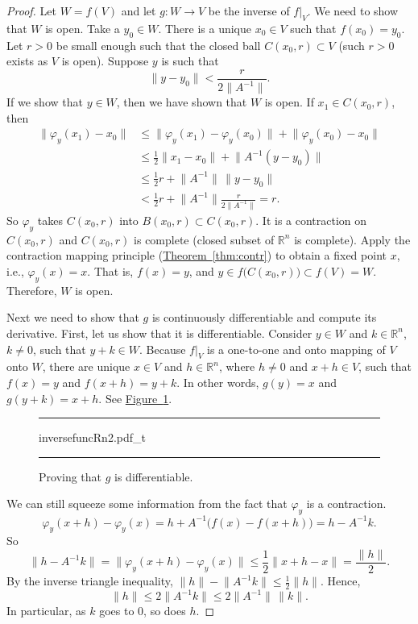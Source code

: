 \documentclass[12pt,openany]{book}
\newcommand{\snorm}[1]{\lVert {#1} \rVert}
\newcommand{\R}{{\mathbb{R}}}
\theoremstyle{plain}
\theoremstyle{remark}
\theoremstyle{definition}
\newenvironment{myfig}{%
\begin{figure}[h!t]
\noindent\rule{\textwidth}{0.5pt}\vspace{12pt}\par\centering}%
{\par\noindent\rule{\textwidth}{0.5pt}
\end{figure}}
\theoremstyle{exercise}
\theoremstyle{example}
\newcommand{\figureref}[1]{\hyperref[#1]{Figure~\ref*{#1}}}
\newcommand{\thmref}[1]{\hyperref[#1]{Theorem~\ref*{#1}}}
\begin{document}
\begin{proof}
Let $W = f(V)$ and let $g \colon W \to V$ be the inverse of $f|_V$.
We need to show that $W$ is open.  Take a $y_0 \in W$.
There is a unique $x_0 \in V$ such that $f(x_0) = y_0$.
Let $r > 0$ be small enough such that the closed ball $C(x_0,r) \subset V$
(such $r > 0$ exists as $V$ is open).
Suppose $y$ is such that
\begin{equation*}
\snorm{y-y_0} <
\frac{r}{2\snorm{A^{-1}}} .
\end{equation*}
If we show that $y \in W$, then we have shown that $W$ is open.
If $x_1 \in
C(x_0,r)$, then
\begin{equation*}
\begin{split}
\snorm{\varphi_y(x_1)-x_0}
& \leq
\snorm{\varphi_y(x_1)-\varphi_y(x_0)} +
\snorm{\varphi_y(x_0)-x_0} \\
& \leq
\frac{1}{2}\snorm{x_1-x_0} +
\snorm{A^{-1}(y-y_0)} \\
& \leq
\frac{1}{2}r +
\snorm{A^{-1}} \, \snorm{y-y_0} \\
& <
\frac{1}{2}r +
\snorm{A^{-1}}
\frac{r}{2\snorm{A^{-1}}} = r .
\end{split}
\end{equation*}
So $\varphi_y$ takes $C(x_0,r)$ into $B(x_0,r) \subset C(x_0,r)$.  It is a
contraction on $C(x_0,r)$ and $C(x_0,r)$ is complete (closed subset of $\R^n$
is complete).
Apply the contraction mapping principle (\thmref{thm:contr})
to obtain a fixed point $x$,
i.e., $\varphi_y(x) = x$.  That is, $f(x) = y$, and $y \in
f\bigl(C(x_0,r)\bigr) \subset f(V) = W$.  Therefore, $W$ is open.

Next we need to show that $g$ is continuously differentiable and compute
its derivative.  First, let us show that it is differentiable.
Consider $y \in W$ and $k \in \R^n$, $k\not= 0$, such that $y+k \in W$.
Because $f|_V$ is a one-to-one and onto mapping of $V$ onto $W$,
there are unique
$x \in V$ and $h \in \R^n$, where $h \not= 0$ and $x+h \in V$, such that
$f(x) = y$ and $f(x+h) = y+k$.
In other words, $g(y) = x$ and $g(y+k) = x+h$.  See
\figureref{fig:inversefuncRn2}.
\begin{myfig}
{inversefuncRn2.pdf_t}
\caption{Proving that $g$ is differentiable.\label{fig:inversefuncRn2}}
\end{myfig}

We can still
squeeze some information from the fact that $\varphi_y$ is a contraction.
\begin{equation*}
\varphi_y(x+h)-\varphi_y(x) = h + A^{-1} \bigl( f(x)-f(x+h) \bigr) = h - A^{-1} k .
\end{equation*}
So
\begin{equation*}
\snorm{h-A^{-1}k} = \snorm{\varphi_y(x+h)-\varphi_y(x)} \leq
\frac{1}{2}\snorm{x+h-x} = \frac{\snorm{h}}{2}.
\end{equation*}
By the inverse triangle inequality, $\snorm{h} - \snorm{A^{-1}k} \leq
\frac{1}{2}\snorm{h}$.
Hence,
\begin{equation*}
\snorm{h} \leq 2 \snorm{A^{-1}k} \leq 2 \snorm{A^{-1}} \, \snorm{k}.
\end{equation*}
In particular, as $k$ goes to $0$, so does $h$.


\end{proof}
\end{document}
